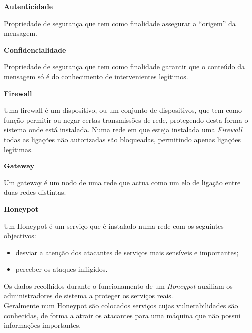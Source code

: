 \label{appendix:1}
\begin{description}
    \item \textbf{Autenticidade}

    Propriedade de segurança que tem como finalidade assegurar a “origem” da mensagem.
\end{description}

\begin{description}
    \item \textbf{Confidencialidade}

    Propriedade de segurança que tem como finalidade garantir que o conteúdo da mensagem só é do conhecimento de intervenientes legítimos.
\end{description}

\begin{description}
    \item \textbf{Firewall}

    Uma firewall é um dispositivo, ou um conjunto de dispositivos, que tem como função permitir ou negar certas transmissões de rede, protegendo desta forma o sistema onde está instalada. Numa rede em que esteja instalada uma \textit{Firewall} todas as ligações não autorizadas são bloqueadas, permitindo apenas ligações legítimas.
\end{description}

\begin{description}
    \item \textbf{Gateway}
    
    Um gateway é um nodo de uma rede que actua como um elo de ligação entre duas redes distintas.
\end{description}

\begin{description}
    \item \textbf{Honeypot}

    Um Honeypot é um serviço que é instalado numa rede com os seguintes objectivos:
    \begin{itemize}
        \item desviar a atenção dos atacantes de serviços mais sensíveis e importantes;
        \item perceber os ataques infligidos.
    \end{itemize}
    
    Os dados recolhidos durante o funcionamento de um \textit{Honeypot} auxiliam os administradores de sistema a proteger os serviços reais.\\
    
    Geralmente num Honeypot são colocados serviços cujas vulnerabilidades são conhecidas, de forma a atrair os atacantes para uma máquina que não possui informações importantes.
\end{description}

